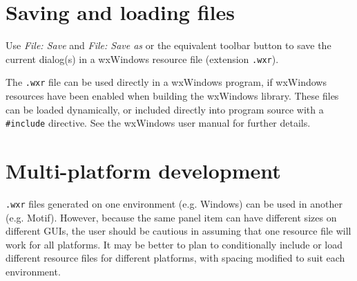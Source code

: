 \section{Saving and loading files}

Use {\it File: Save} and {\it File: Save as} or the equivalent toolbar button
to save the current dialog(s) in a wxWindows resource file (extension {\tt .wxr}).

The {\tt .wxr} file can be used directly in a wxWindows program, if
wxWindows resources have been enabled when building the wxWindows library.
These files can be loaded dynamically, or included directly into program source
with a \verb$#include$ directive. See the wxWindows user manual for further details.

\section{Multi-platform development}

{\tt .wxr} files generated on one environment (e.g. Windows) can be used in another (e.g. Motif).
However, because the same panel item can have different sizes on different GUIs,
the user should be cautious in assuming that one resource file will work for all
platforms. It may be better to plan to conditionally include or load different
resource files for different platforms, with spacing modified to suit each
environment.

